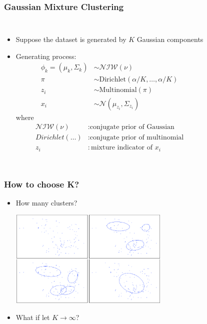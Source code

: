 \documentclass{beamer}
\begin{document}
\begin{frame}
	\frametitle{Gaussian Mixture Clustering}
	
	\begin{columns}
		\begin{itemize}
			
			\item Suppose the dataset is generated by $K$ Gaussian components 
			\item Generating process:
			\begin{align*}
			\phi_k = (\mu_k, \Sigma_k) & \sim \mathcal{NIW}(\nu) \\
			\pi & \sim \text{Dirichlet}(\alpha/K, \ldots, \alpha/K) \\
			z_i & \sim \text{Multinomial}(\pi) \\
			x_i & \sim \mathcal{N}(\mu_{z_i}, \Sigma_{z_i})
			\end{align*}
			where 
			\begin{align*}
			\mathcal{NIW}(\nu) & : \text{conjugate prior of Gaussian} \\
			Dirichlet(\ldots) & : \text{conjugate prior of multinomial} \\
			z_i & : \text{mixture indicator of } x_i
			\end{align*}
		\end{itemize}
		\centering
	\end{columns}
\end{frame}

\begin{frame}
	\frametitle{How to choose K?}
	\begin{itemize}
		\item How many clusters?
		\begin{center}
			\includegraphics[width=0.6\textwidth]{img/unknown.png}
		\end{center}		
		\pause 
		\item What if let $K \rightarrow \infty$?
	\end{itemize}
\end{frame}
\end{document}
